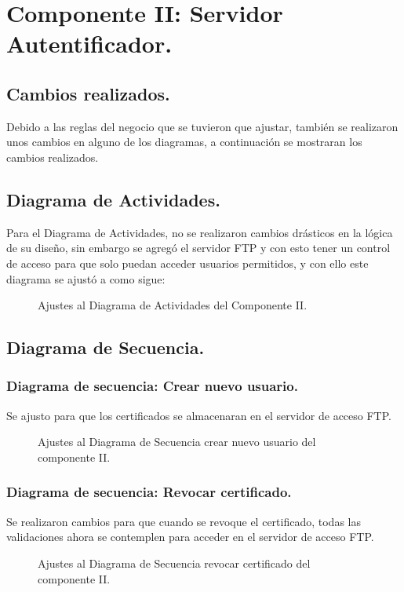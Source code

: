 \documentclass[12pt, a4paper, titlepage]{report}
\begin{document}
        
        \section{Componente II: Servidor Autentificador.}
            \subsection{Cambios realizados.}
            Debido a las reglas del negocio que se tuvieron que ajustar, también se realizaron unos cambios en alguno de los diagramas, a continuación se mostraran los cambios realizados. 
            
            \subsection{Diagrama de Actividades.}
            Para el Diagrama de Actividades, no se realizaron cambios drásticos en la lógica de su diseño, sin embargo se agregó el servidor FTP y con esto tener un control de acceso para que solo puedan acceder usuarios permitidos, y con ello este diagrama se ajustó a como sigue:
                \begin{figure}[H]
                    \centering                    
                    \caption{Ajustes al Diagrama de Actividades del Componente II.}
                    \label{fig:CII_DA_PII}
                \end{figure}
                
            \subsection{Diagrama de Secuencia.}
                \subsubsection{Diagrama de secuencia: Crear nuevo usuario.}
                Se ajusto para que los certificados se almacenaran en el servidor de acceso FTP.
                    \begin{figure}[H]
                        \centering              
                        \caption{Ajustes al Diagrama de Secuencia crear nuevo usuario del componente II.}
                        \label{fig:CII_SD_UC1_PII}
                    \end{figure}
                    
                \subsubsection{Diagrama de secuencia: Revocar certificado.}
                Se realizaron cambios para que cuando se revoque el certificado, todas las validaciones ahora se contemplen para acceder en el servidor de acceso FTP.
	                \begin{figure}[H]
                        \centering                        
                        \caption{Ajustes al Diagrama de Secuencia revocar certificado del componente II.}
                        \label{fig:CII_SD_UC2_PII}
                    \end{figure}
                    
\end{document}
